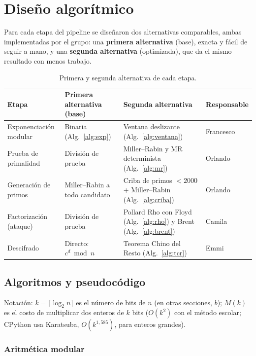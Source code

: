 \section{Diseño algorítmico}
\label{sec:diseno-algoritmico}

Para cada etapa del pipeline se diseñaron dos alternativas comparables, ambas
implementadas por el grupo: una \textbf{primera alternativa} (base), exacta y
fácil de seguir a mano, y una \textbf{segunda alternativa} (optimizada), que da
el mismo resultado con menos trabajo.

\begin{table}[H]
\centering\small
\caption{Primera y segunda alternativa de cada etapa.}
\label{tab:alternativas}
\begin{tabularx}{\textwidth}{@{}l Y Y l@{}}
\toprule
\textbf{Etapa} & \textbf{Primera alternativa (base)} & \textbf{Segunda alternativa} & \textbf{Responsable}\\
\midrule
Exponenciación modular & Binaria (Alg.~\ref{alg:exp}) & Ventana deslizante (Alg.~\ref{alg:ventana}) & Francesco\\
Prueba de primalidad & División de prueba & Miller--Rabin y MR determinista (Alg.~\ref{alg:mr}) & Orlando\\
Generación de primos & Miller--Rabin a todo candidato & Criba de primos $< 2000$ + Miller--Rabin (Alg.~\ref{alg:criba}) & Orlando\\
Factorización (ataque) & División de prueba & Pollard Rho con Floyd (Alg.~\ref{alg:rho}) y Brent (Alg.~\ref{alg:brent}) & Camila\\
Descifrado & Directo: $c^d \bmod n$ & Teorema Chino del Resto (Alg.~\ref{alg:tcr}) & Emmi\\
\bottomrule
\end{tabularx}
\end{table}

\subsection{Algoritmos y pseudocódigo}
\label{sec:pseudocodigo}

Notación: $k = \lceil \log_2 n \rceil$ es el número de bits de $n$ (en otras secciones, $b$);
$M(k)$ es el costo de multiplicar dos enteros de $k$ bits ($O(k^2)$ con el
método escolar; CPython usa Karatsuba, $O(k^{1{,}585})$, para enteros grandes).

\subsubsection{Aritmética modular}

